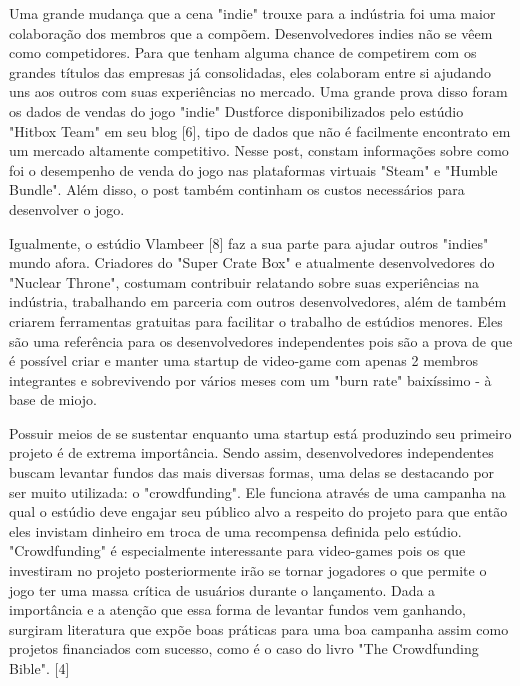 Uma grande mudança que a cena "indie" trouxe para a indústria foi uma maior colaboração dos membros que a compõem. Desenvolvedores indies não se vêem como competidores. Para que tenham alguma chance de competirem com os grandes títulos das empresas já consolidadas, eles colaboram entre si ajudando uns aos outros com suas experiências no mercado. Uma grande prova disso foram os dados de vendas do jogo "indie" Dustforce disponibilizados pelo estúdio "Hitbox Team" em seu blog [6], tipo de dados que não é facilmente encontrato em um mercado altamente competitivo. Nesse post, constam informações sobre como foi o desempenho de venda do jogo nas plataformas virtuais "Steam" e "Humble Bundle". Além disso, o post também continham os custos necessários para desenvolver o jogo.

Igualmente, o estúdio Vlambeer [8] faz a sua parte para ajudar outros "indies" mundo afora. Criadores do "Super Crate Box" e atualmente desenvolvedores do "Nuclear Throne", costumam contribuir relatando sobre suas experiências na indústria, trabalhando em parceria com outros desenvolvedores, além de também criarem ferramentas gratuitas para facilitar o trabalho de estúdios menores. Eles são uma referência para os desenvolvedores independentes pois são a prova de que é possível criar e manter uma startup de video-game com apenas 2 membros integrantes e sobrevivendo por vários meses com um "burn rate" baixíssimo - à base de miojo.

Possuir meios de se sustentar enquanto uma startup está produzindo seu primeiro projeto é de extrema importância. Sendo assim, desenvolvedores independentes buscam levantar fundos das mais diversas formas, uma delas se destacando por ser muito utilizada: o "crowdfunding". Ele funciona através de uma campanha na qual o estúdio deve engajar seu público alvo a respeito do projeto para que então eles invistam dinheiro em troca de uma recompensa definida pelo estúdio. "Crowdfunding" é especialmente interessante para video-games pois os que investiram no projeto posteriormente irão se tornar jogadores o que permite o jogo ter uma massa crítica de usuários durante o lançamento. Dada a importância e a atenção que essa forma de levantar fundos vem ganhando, surgiram literatura que expõe boas práticas para uma boa campanha assim como projetos financiados com sucesso, como é o caso do livro "The Crowdfunding Bible". [4]


